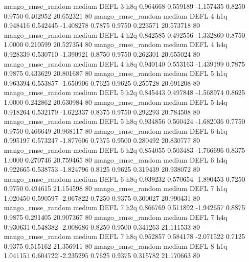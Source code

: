 mango_rmse_random     medium     DEFL                 3                  h8q  0.964668 0.559189 -1.157435 0.8250 0.9750  0.402952   20.652321 80
mango_rmse_random     medium     DEFL                 4                  h1q  0.948416 0.542445 -1.408278 0.7875 0.9750  0.223571   20.573718 80
mango_rmse_random     medium     DEFL                 4                  h2q  0.842585 0.492556 -1.332860 0.8750 1.0000  0.210599   20.527354 80
mango_rmse_random     medium     DEFL                 4                  h4q  0.928339 0.530710 -1.390921 0.8750 0.9750  0.262301   20.655024 80
mango_rmse_random     medium     DEFL                 4                  h8q  0.940140 0.553163 -1.439199 0.7875 0.9875  0.433629   20.801687 80
mango_rmse_random     medium     DEFL                 5                  h1q  0.963394 0.553857 -1.650906 0.7625 0.9625  0.255728   20.691208 80
mango_rmse_random     medium     DEFL                 5                  h2q  0.845443 0.497848 -1.568974 0.8625 1.0000  0.242862   20.630984 80
mango_rmse_random     medium     DEFL                 5                  h4q  0.918264 0.532179 -1.622337 0.8375 0.9750  0.292293   20.784508 80
mango_rmse_random     medium     DEFL                 5                  h8q  0.934856 0.560424 -1.682036 0.7750 0.9750  0.466649   20.968117 80
mango_rmse_random     medium     DEFL                 6                  h1q  0.995197 0.573247 -1.877606 0.7375 0.9500  0.280492   20.830777 80
mango_rmse_random     medium     DEFL                 6                  h2q  0.854055 0.503483 -1.766696 0.8375 1.0000  0.270746   20.759465 80
mango_rmse_random     medium     DEFL                 6                  h4q  0.922665 0.538753 -1.824796 0.8125 0.9625  0.319439   20.938072 80
mango_rmse_random     medium     DEFL                 6                  h8q  0.939232 0.570654 -1.890453 0.7250 0.9750  0.494615   21.154598 80
mango_rmse_random     medium     DEFL                 7                  h1q  1.020450 0.590597 -2.067822 0.7250 0.9375  0.300027   20.990431 80
mango_rmse_random     medium     DEFL                 7                  h2q  0.866769 0.511892 -1.942657 0.8875 0.9875  0.291405   20.907367 80
mango_rmse_random     medium     DEFL                 7                  h4q  0.930631 0.548382 -2.008686 0.8250 0.9500  0.341263   21.111533 80
mango_rmse_random     medium     DEFL                 7                  h8q  0.952857 0.584178 -2.071522 0.7125 0.9375  0.515162   21.356911 80
mango_rmse_random     medium     DEFL                 8                  h1q  1.041151 0.604722 -2.235295 0.7625 0.9375  0.315782   21.170663 80
